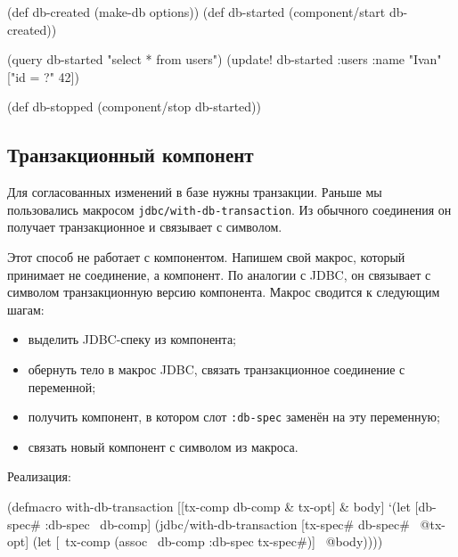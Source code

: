\else

\begin{english}
  \begin{clojure}
(def db-created (make-db options))
(def db-started (component/start db-created))

(query db-started "select * from users")
(update! db-started :users {:name "Ivan"} ["id = ?" 42])

(def db-stopped (component/stop db-started))
  \end{clojure}
\end{english}

\fi

\subsection{Транзакционный компонент}


Для согласованных изменений в базе нужны транзакции. Раньше мы пользовались
макросом \verb|jdbc/with-db-transaction|. Из обычного соединения он получает
транзакционное и связывает с символом.

Этот способ не работает с компонентом. Напишем свой макрос, который принимает не
соединение, а компонент. По аналогии с JDBC, он связывает с символом
транзакционную версию компонента. Макрос сводится к следующим шагам:

\begin{itemize}

\item
  выделить JDBC-спеку из компонента;

\item
  обернуть тело в макрос JDBC, связать транзакционное соединение с переменной;

\item
  получить компонент, в котором слот \verb|:db-spec| заменён на эту переменную;

\item
  связать новый компонент с символом из макроса.

\end{itemize}

Реализация:

\ifnarrow

\begin{english}
  \begin{clojure}
(defmacro with-db-transaction
  [[tx-comp db-comp & tx-opt] & body]
  `(let [{db-spec# :db-spec} ~db-comp]
     (jdbc/with-db-transaction
       [tx-spec# db-spec# ~@tx-opt]
       (let [~tx-comp
             (assoc ~db-comp
               :db-spec tx-spec#)]
         ~@body))))
  \end{clojure}
\end{english}

